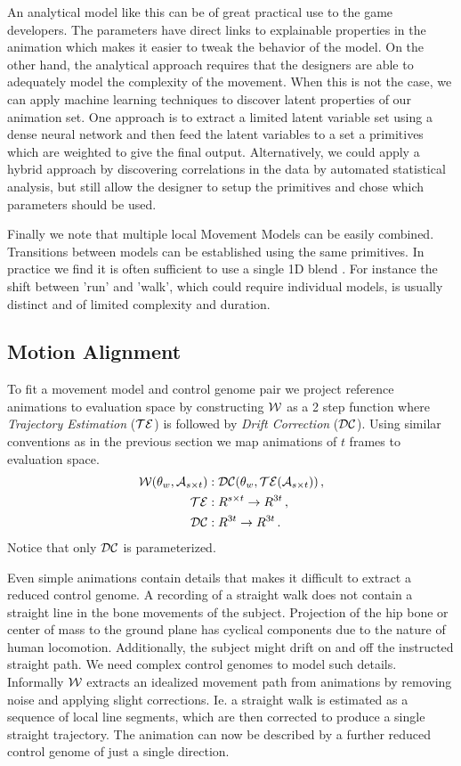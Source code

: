 An analytical model like this can be of great practical use to the game developers. The parameters have direct links to explainable properties in the animation which makes it easier to tweak the behavior of the model. On the other hand, the analytical approach requires that the designers are able to adequately model the complexity of the movement. 
%
When this is not the case, we can apply machine learning techniques to discover latent properties of our animation set. %
One approach is to extract a limited latent variable set using a dense neural network and then feed the latent variables to a set a primitives which are weighted to give the final output. 
Alternatively, we could apply a hybrid approach by discovering correlations in the data by automated statistical analysis, but still allow the designer to setup the primitives and chose which parameters should be used. 

Finally we note that multiple local Movement Models can be easily combined. Transitions between models can be established using the same primitives. In practice we find it is often sufficient to use a single 1D blend . For instance the shift between 'run' and 'walk', which could require individual models, is usually distinct and of limited complexity and duration. 

\subsection{Motion Alignment}
To fit a movement model and control genome pair we project reference animations to evaluation space by constructing $\mathcal{W}$ as a 2 step function where \textit{Trajectory Estimation} ($\mathcal{TE}$) is followed by \textit{Drift Correction} ($\mathcal{DC}$). Using similar conventions as in the previous section we map animations of $t$ frames to evaluation space. 
\begin{subequations}
\begin{align}
    \mathcal{W}(\theta_{w},\mathcal{A}_{s\times{t}})&:\mathcal{DC}(\theta_{w},\mathcal{TE}(\mathcal{A}_{s\times{t}})) \,,\\
    \mathcal{TE}&:R^{s\times{t}} \rightarrow  R^{3t} \,,\\
    \mathcal{DC}&:R^{3t} \rightarrow R^{3t} \,.
\end{align}
\end{subequations}
Notice that only $\mathcal{DC}$ is parameterized.

Even simple animations contain details that makes it difficult to extract a reduced control genome. A recording of a straight walk does not contain a straight line in the bone movements of the subject. Projection of the hip bone or center of mass to the ground plane has cyclical components due to the nature of human locomotion. Additionally, the subject might drift on and off the instructed straight path. We need complex control genomes to model such details. 
Informally $\mathcal{W}$ extracts an idealized movement path from animations by removing noise and applying slight corrections. Ie. a straight walk is estimated as a sequence of local line segments, which are then corrected to produce a single straight trajectory. The animation can now be described by a further reduced control genome of just a single direction.

